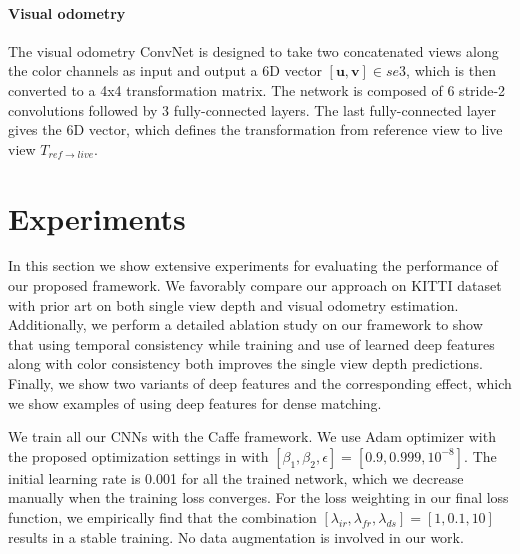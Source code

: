 \documentclass[10pt,twocolumn,letterpaper]{article}
\begin{document}
\paragraph{Visual odometry}

The visual odometry ConvNet is designed to take two concatenated views along the color channels as input and output a 6D vector $[\mathbf{u},\mathbf{v}] \in se3$, which is then converted to a 4x4 transformation matrix. 
The network is composed of 6 stride-2 convolutions followed by 3 fully-connected layers. The last fully-connected layer gives the 6D vector, which defines the transformation from reference view to live view $T_{ref \rightarrow live}$. 

\section{Experiments} \label{sec:expRes}
In this section we show extensive experiments for evaluating the performance of our proposed framework. We favorably compare our approach on KITTI dataset \cite{Geiger2012kitti}\cite{Geiger2013kitti} with prior art on both single view depth and visual odometry estimation. 
Additionally, we perform a detailed ablation study on our framework to show that using temporal consistency while training and use of learned deep features along with color consistency both improves the single view depth predictions.
Finally, we show two variants of deep features and the corresponding effect, which we show examples of using deep features for dense matching.

We train all our CNNs with the Caffe \cite{jia2014caffe} framework. 
We use Adam optimizer with the proposed optimization settings in \cite{kingma2014adam} with 
$[\beta_1, \beta_2, \epsilon] = [0.9, 0.999, 10^{-8}]$. The initial learning rate is 0.001 for all the trained network, which we decrease manually when the training loss converges. For the loss weighting in our final loss function, we empirically find that the combination $[\lambda_{ir}, \lambda_{fr}, \lambda_{ds}] = [1, 0.1, 10]$ results in a stable training. No data augmentation is involved in our work.
\end{document}
